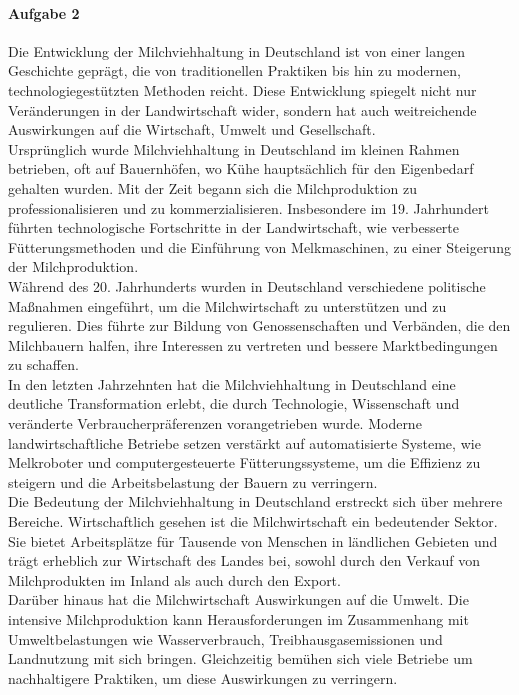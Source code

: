\documentclass[11pt,a4paper]{report}
\begin{document}
	\paragraph{Aufgabe 2}
	Die Entwicklung der Milchviehhaltung in Deutschland ist von einer langen Geschichte geprägt, die von traditionellen Praktiken bis hin zu modernen, technologiegestützten Methoden reicht.
	Diese Entwicklung spiegelt nicht nur Veränderungen in der Landwirtschaft wider, sondern hat auch weitreichende Auswirkungen auf die Wirtschaft, Umwelt und Gesellschaft. \\
Ursprünglich wurde Milchviehhaltung in Deutschland im kleinen Rahmen betrieben, oft auf Bauernhöfen, wo Kühe hauptsächlich für den Eigenbedarf gehalten wurden.
	Mit der Zeit begann sich die Milchproduktion zu professionalisieren und zu kommerzialisieren.
	Insbesondere im 19. Jahrhundert führten technologische Fortschritte in der Landwirtschaft, wie verbesserte Fütterungsmethoden und die Einführung von Melkmaschinen, zu einer Steigerung der Milchproduktion. \\
	Während des 20. Jahrhunderts wurden in Deutschland verschiedene politische Maßnahmen eingeführt, um die Milchwirtschaft zu unterstützen und zu regulieren.
	Dies führte zur Bildung von Genossenschaften und Verbänden, die den Milchbauern halfen, ihre Interessen zu vertreten und bessere Marktbedingungen zu schaffen. \\
	In den letzten Jahrzehnten hat die Milchviehhaltung in Deutschland eine deutliche Transformation erlebt, die durch Technologie, Wissenschaft und veränderte Verbraucherpräferenzen vorangetrieben wurde.
	Moderne landwirtschaftliche Betriebe setzen verstärkt auf automatisierte Systeme, wie Melkroboter und computergesteuerte Fütterungssysteme, um die Effizienz zu steigern und die Arbeitsbelastung der Bauern zu verringern. \\
	Die Bedeutung der Milchviehhaltung in Deutschland erstreckt sich über mehrere Bereiche.
	Wirtschaftlich gesehen ist die Milchwirtschaft ein bedeutender Sektor.
	Sie bietet Arbeitsplätze für Tausende von Menschen in ländlichen Gebieten und trägt erheblich zur Wirtschaft des Landes bei, sowohl durch den Verkauf von Milchprodukten im Inland als auch durch den Export. \\
	Darüber hinaus hat die Milchwirtschaft Auswirkungen auf die Umwelt. 
	Die intensive Milchproduktion kann Herausforderungen im Zusammenhang mit Umweltbelastungen wie Wasserverbrauch, Treibhausgasemissionen und Landnutzung mit sich bringen.
	Gleichzeitig bemühen sich viele Betriebe um nachhaltigere Praktiken, um diese Auswirkungen zu verringern.
\end{document}
